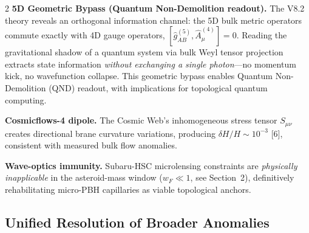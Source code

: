 \documentclass[11pt]{article}
\begin{document}
\begin{multicols}{2}
\textbf{5D Geometric Bypass (Quantum Non-Demolition readout).} The V8.2 theory reveals an orthogonal information channel: the 5D bulk metric operators commute exactly with 4D gauge operators, $[\hat{g}_{AB}^{(5)}, \hat{A}_\mu^{(4)}] = 0$. Reading the gravitational shadow of a quantum system via bulk Weyl tensor projection extracts state information \textit{without exchanging a single photon}---no momentum kick, no wavefunction collapse. This geometric bypass enables Quantum Non-Demolition (QND) readout, with implications for topological quantum computing.

\textbf{Cosmicflows-4 dipole.} The Cosmic Web's inhomogeneous stress tensor $S_{\mu\nu}$ creates directional brane curvature variations, producing $\delta H/H \sim 10^{-3}$ [6], consistent with measured bulk flow anomalies.

\textbf{Wave-optics immunity.} Subaru-HSC microlensing constraints are \textit{physically inapplicable} in the asteroid-mass window ($w_F \ll 1$, see Section~2), definitively rehabilitating micro-PBH capillaries as viable topological anchors.

\subsection{Unified Resolution of Broader Anomalies}


\end{multicols}
\end{document}
